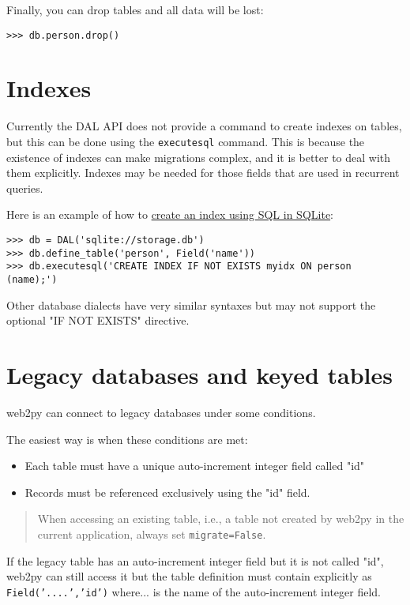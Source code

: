 \documentclass[justified,sixbynine,notoc]{tufte-book}
\def\ft{\small\tt}
\def\inxx#1{\index{#1}}
\begin{document}
\begin{fullwidth}
Finally, you can drop tables and all data will be lost:

\inxx{drop}
\begin{lstlisting}
>>> db.person.drop()
\end{lstlisting}

\goodbreak\section{Indexes}

Currently the DAL API does not provide a command to create indexes on tables, but this can be done using the {\ft executesql} command. This is because the existence of indexes can make migrations complex, and it is better to deal with them explicitly. Indexes may be needed for those fields that are used in recurrent queries.

Here is an example of how to {\footnotesize\href{http://www.sqlite.org/lang\_createindex.html}{create an index using SQL in SQLite}}:
\begin{lstlisting}
>>> db = DAL('sqlite://storage.db')
>>> db.define_table('person', Field('name'))
>>> db.executesql('CREATE INDEX IF NOT EXISTS myidx ON person (name);')
\end{lstlisting}

Other database dialects have very similar syntaxes but may not support the optional "IF NOT EXISTS" directive.

\goodbreak\section{Legacy databases and keyed tables}
\noindent web2py can connect to legacy databases under some conditions.

The easiest way is when these conditions are met:
\begin{itemize}
\item Each table must have a unique auto-increment integer field called "id"

\item Records must be referenced exclusively using the "id" field.
\end{itemize}

\begin{quote}When accessing an existing table, i.e., a table not created by web2py in the current application, always set {\ft migrate=False}.\end{quote}
If the legacy table has an auto-increment integer field but it is not called "id", web2py can still access it but the table definition must contain explicitly as {\ft Field('....','id')} where... is the name of the auto-increment integer field.


\end{fullwidth}
\end{document}
